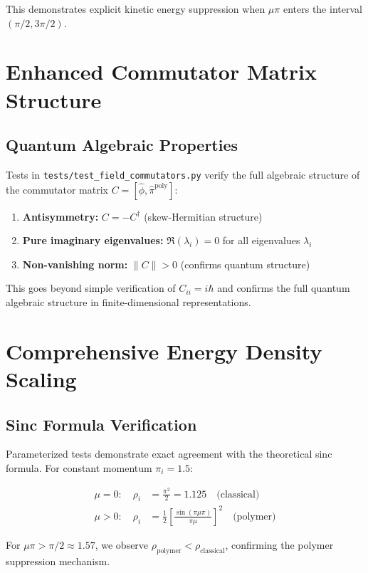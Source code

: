 \documentclass[11pt]{article}
\begin{document}
This demonstrates explicit kinetic energy suppression when $\mu\pi$ enters the interval $(\pi/2, 3\pi/2)$.

\section{Enhanced Commutator Matrix Structure}

\subsection{Quantum Algebraic Properties}
Tests in \texttt{tests/test\_field\_commutators.py} verify the full algebraic structure of the commutator matrix $C = [\hat{\phi}, \hat{\pi}^{\text{poly}}]$:

\begin{enumerate}
\item \textbf{Antisymmetry:} $C = -C^\dagger$ (skew-Hermitian structure)
\item \textbf{Pure imaginary eigenvalues:} $\Re(\lambda_i) = 0$ for all eigenvalues $\lambda_i$
\item \textbf{Non-vanishing norm:} $\|C\| > 0$ (confirms quantum structure)
\end{enumerate}

This goes beyond simple verification of $C_{ii} = i\hbar$ and confirms the full quantum algebraic structure in finite-dimensional representations.

\section{Comprehensive Energy Density Scaling}

\subsection{Sinc Formula Verification}
Parameterized tests demonstrate exact agreement with the theoretical sinc formula. For constant momentum $\pi_i = 1.5$:

\begin{align}
\mu = 0: \quad \rho_i &= \frac{\pi^2}{2} = 1.125 \quad \text{(classical)} \\
\mu > 0: \quad \rho_i &= \frac{1}{2}\left[\frac{\sin(\pi\mu\pi)}{\pi\mu}\right]^2 \quad \text{(polymer)}
\end{align}

For $\mu\pi > \pi/2 \approx 1.57$, we observe $\rho_{\text{polymer}} < \rho_{\text{classical}}$, confirming the polymer suppression mechanism.
\end{document}
